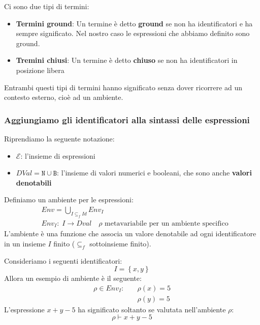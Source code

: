 \documentclass[a4paper]{article}
\begin{document}
Ci sono due tipi di termini:
\begin{itemize}
  \item \textbf{Termini ground}:
    Un termine è detto \textbf{ground} se non ha identificatori e ha sempre significato.
    Nel nostro caso le espressioni che abbiamo definito sono ground.

  \item \textbf{Tremini chiusi}:
    Un termine è detto \textbf{chiuso} se non ha identificatori in posizione libera
\end{itemize}
Entrambi questi tipi di termini hanno significato senza dover ricorrere ad un
contesto esterno, cioè ad un ambiente.

\subsubsection{Aggiungiamo gli identificatori alla sintassi delle espressioni}
Riprendiamo la seguente notazione:
\begin{itemize}
  \item \( \mathcal{E} \): l'insieme di espressioni

  \item \( DVal = \texttt{N} \cup \texttt{B} \): l'insieme di valori numerici e
    booleani, che sono anche \textbf{valori denotabili}
\end{itemize}

\vspace{1em}
\noindent
Definiamo un ambiente per le espressioni:
\[
  \begin{aligned}
    &Env = \bigcup_{I \subseteq_f Id} Env_I \\
    &Env_I:\; I \to Dval \quad \rho \text{ metavariabile per un ambiente specifico}
  \end{aligned}
\] 
L'ambiente è una funzione che associa un valore denotabile ad ogni identificatore
in un insieme \( I \) finito (\( \subseteq_f \) sottoinsieme finito).

\begin{example}
  Consideriamo i seguenti identificatori:
  \[
    I = \left\{ x, y \right\}
  \] 
  Allora un esempio di ambiente è il seguente:
  \[
  \begin{aligned}
    \rho \in Env_I: \quad &\rho(x) = 5 \\
                 &\rho(y) = 5
  \end{aligned}
  \] 
  L'espressione \( x + y - 5 \) ha significato soltanto se valutata nell'ambiente
  \( \rho \):
  \[
    \rho \vdash x + y - 5
  \] 
\end{example}
\end{document}
